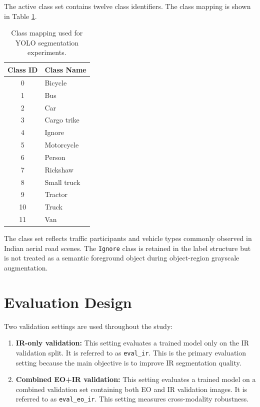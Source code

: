 The active class set contains twelve class identifiers. The class mapping is shown in Table \ref{tab:class_mapping}.

\begin{table}[h]
\centering
\caption{Class mapping used for YOLO segmentation experiments.}
\label{tab:class_mapping}
\begin{tabular}{cl}
\hline
\textbf{Class ID} & \textbf{Class Name} \\
\hline
0 & Bicycle \\
1 & Bus \\
2 & Car \\
3 & Cargo trike \\
4 & Ignore \\
5 & Motorcycle \\
6 & Person \\
7 & Rickshaw \\
8 & Small truck \\
9 & Tractor \\
10 & Truck \\
11 & Van \\
\hline
\end{tabular}
\end{table}

The class set reflects traffic participants and vehicle types commonly observed in Indian aerial road scenes. The \texttt{Ignore} class is retained in the label structure but is not treated as a semantic foreground object during object-region grayscale augmentation.

\section{Evaluation Design}

Two validation settings are used throughout the study:

\begin{enumerate}
    \item \textbf{IR-only validation:} This setting evaluates a trained model only on the IR validation split. It is referred to as \texttt{eval\_ir}. This is the primary evaluation setting because the main objective is to improve IR segmentation quality.
    \item \textbf{Combined EO+IR validation:} This setting evaluates a trained model on a combined validation set containing both EO and IR validation images. It is referred to as \texttt{eval\_eo\_ir}. This setting measures cross-modality robustness.
\end{enumerate}

